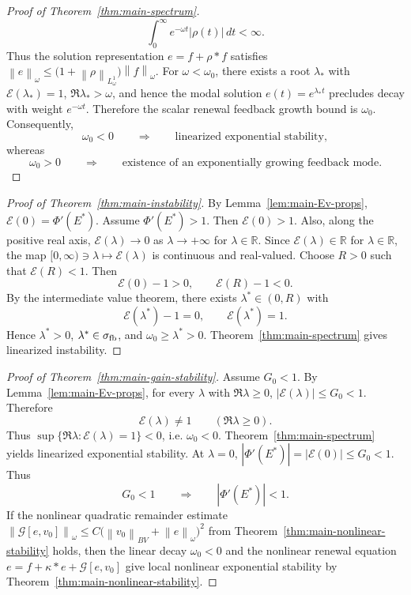 \documentclass[pdflatex,sn-mathphys-num]{sn-jnl}
\theoremstyle{thmstyleone}
\theoremstyle{definition}
\theoremstyle{remark}
\newcommand{\R}{\mathbb{R}}
\newcommand{\Ev}{\mathcal{E}}
\newcommand{\Gcal}{\mathcal{G}}
\newcommand{\norm}[1]{\left\lVert#1\right\rVert}
\newcommand{\abs}[1]{\left\lvert#1\right\rvert}
\numberwithin{equation}{section}
\begin{document}
\begin{proof}[Proof of Theorem~\ref{thm:main-spectrum}]
\[\int_0^\infty e^{-\omega t}\abs{\rho(t)}\,dt<\infty .
\]
Thus the solution representation
$\displaystyle 
e=f+\rho*f$
satisfies
$\displaystyle 
\norm{e}_\omega
\le
\big(1+\norm{\rho}_{L^1_\omega}\big)\norm{f}_\omega$.
For \(\omega<\omega_0\), there exists a root \(\lambda_*\) with
$\Ev(\lambda_*)=1$,
$\Re\lambda_*>\omega$,
and hence the modal solution
$\displaystyle 
e(t)=e^{\lambda_*t}$
precludes decay with weight \(e^{-\omega t}\). Therefore the scalar renewal
feedback growth bound is
$\omega_0$.
Consequently,
\[
\omega_0<0
\qquad\Longrightarrow\qquad
\text{linearized exponential stability},
\]
whereas
\[
\omega_0>0
\qquad\Longrightarrow\qquad
\text{existence of an exponentially growing feedback mode}.
\]
\end{proof}
\begin{proof}[Proof of Theorem~\ref{thm:main-instability}]
By Lemma~\ref{lem:main-Ev-props},
$\displaystyle 
\Ev(0)=\Phi'(E^*)$.
Assume
$\displaystyle 
\Phi'(E^*)>1$.
Then
$\displaystyle 
\Ev(0)>1$.
Also, along the positive real axis,
$\Ev(\lambda)\to0$ as $\lambda\to+\infty$ for $\lambda\in\R$.
Since \(\Ev(\lambda)\in\R\) for \(\lambda\in\R\), the map
$\displaystyle 
[0,\infty)\ni\lambda\mapsto \Ev(\lambda)$
is continuous and real-valued. Choose \(R>0\) such that
$\displaystyle 
\Ev(R)<1$.
Then
\[
\Ev(0)-1>0,
\qquad
\Ev(R)-1<0.
\]
By the intermediate value theorem, there exists
$\displaystyle 
\lambda^*\in(0,R)$
with
\[
\Ev(\lambda^*)-1=0,
\qquad
\Ev(\lambda^*)=1.
\]
Hence
$\lambda^*>0$,
$\lambda^*\in\sigma_{\rm fb}$,
and
$\omega_0\ge\lambda^*>0$.
Theorem~\ref{thm:main-spectrum} gives linearized instability.
\end{proof}
\begin{proof}[Proof of Theorem~\ref{thm:main-gain-stability}]
Assume
$\displaystyle 
G_0<1$.
By Lemma~\ref{lem:main-Ev-props}, for every \(\lambda\) with \(\Re\lambda\ge0\),
$\abs{\Ev(\lambda)}\le G_0<1$.
Therefore
\[
\Ev(\lambda)\ne1
\qquad
(\Re\lambda\ge0).
\]
Thus
$\displaystyle 
\sup\{\Re\lambda:\Ev(\lambda)=1\}<0$,
i.e.
$\displaystyle 
\omega_0<0$.
Theorem~\ref{thm:main-spectrum} yields linearized exponential stability.
At \(\lambda=0\),
$\displaystyle 
\abs{\Phi'(E^*)}
=
\abs{\Ev(0)}
\le
G_0<1$.
Thus
\[
G_0<1
\qquad\Longrightarrow\qquad
\abs{\Phi'(E^*)}<1.
\]
If the nonlinear quadratic remainder estimate
$\displaystyle 
\norm{\Gcal[e,v_0]}_\omega
\le
C\big(\norm{v_0}_{BV}+\norm{e}_\omega\big)^2$
from Theorem~\ref{thm:main-nonlinear-stability} holds, then the linear decay
$\displaystyle 
\omega_0<0$
and the nonlinear renewal equation
$\displaystyle 
e=f+\kappa*e+\Gcal[e,v_0]$
give local nonlinear exponential stability by
Theorem~\ref{thm:main-nonlinear-stability}.
\end{proof}
\end{document}
